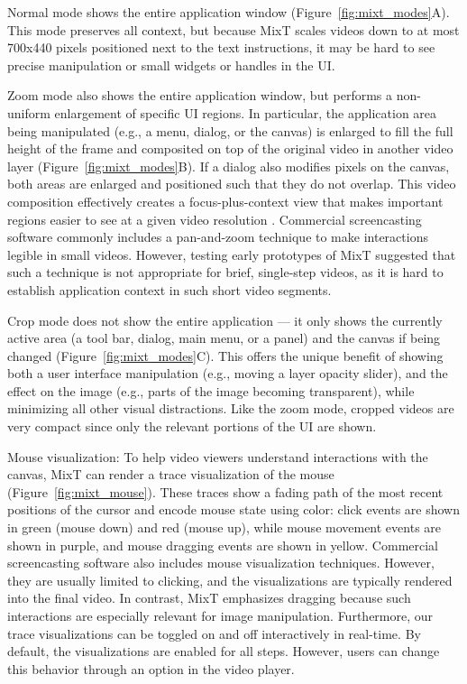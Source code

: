 Normal mode shows the entire application window (Figure~\ref{fig:mixt_modes}A). This mode preserves all context, but because MixT scales videos down to at most 700x440 pixels positioned next to the text instructions, it may be hard to see precise manipulation or small widgets or handles in the UI.

Zoom mode also shows the entire application window, but performs a non-uniform enlargement of specific UI regions. In particular, the application area being manipulated (e.g., a menu, dialog, or the canvas) is enlarged to fill the full height of the frame and composited on top of the original video in another video layer (Figure~\ref{fig:mixt_modes}B). If a dialog also modifies pixels on the canvas, both areas are enlarged and positioned such that they do not overlap. This video composition effectively creates a focus-plus-context view that makes important regions easier to see at a given video resolution \cite{Furnas:1986:GFV:22627.22342}. Commercial screencasting software commonly includes a pan-and-zoom technique to make interactions legible in small videos. However, testing early prototypes of MixT suggested that such a technique is not appropriate for brief, single-step videos, as it is hard to establish application context in such short video segments.

Crop mode does not show the entire application — it only shows the currently active area (a tool bar, dialog, main menu, or a panel) and the canvas if being changed (Figure~\ref{fig:mixt_modes}C). This offers the unique benefit of showing both a user interface manipulation (e.g., moving a layer opacity slider), and the effect on the image (e.g., parts of the image becoming transparent), while minimizing all other visual distractions. Like the zoom mode, cropped videos are very compact since only the relevant portions of the UI are shown.

Mouse visualization: To help video viewers understand interactions with the canvas, MixT can render a trace visualization of the mouse (Figure~\ref{fig:mixt_mouse}). These traces show a fading path of the most recent positions of the cursor and encode mouse state using color: click events are shown in green (mouse down) and red (mouse up), while mouse movement events are shown in purple, and mouse dragging events are shown in yellow. Commercial screencasting software also includes mouse visualization techniques. However, they are usually limited to clicking, and the visualizations are typically rendered into the final video. In contrast, MixT emphasizes dragging because such interactions are especially relevant for image manipulation. Furthermore, our trace visualizations can be toggled on and off interactively in real-time. By default, the visualizations are enabled for all steps. However, users can change this behavior through an option in the video player.

